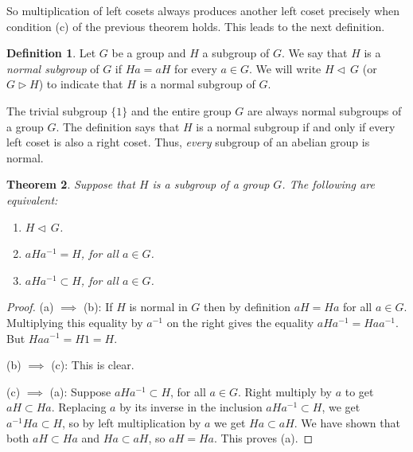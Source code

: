 \documentclass[11pt]{article}
\newtheorem{thm}{Theorem}[section]
\theoremstyle{definition}
\newtheorem{defn}[thm]{Definition}
\newcommand{\normal}{\triangleleft\,}%
\newcommand{\morenormal}{\triangleright}
\begin{document}
So multiplication of left cosets always produces another left coset
precisely when condition (c) of the previous theorem holds. This leads
to the next definition.

\begin{defn}
Let $G$ be a group and $H$ a subgroup of $G$. We say that $H$ is a
{\em normal subgroup} of $G$ if $Ha = aH$ for every $a\in G$. We will
write $H \normal G$ (or $G \morenormal H$) to indicate that $H$ is a
normal subgroup of $G$.
\end{defn}

The trivial subgroup $\{1\}$ and the entire group $G$ are always
normal subgroups of a group $G$.  The definition says that $H$ is a
normal subgroup if and only if every left coset is also a right coset.
Thus, \emph{every} subgroup of an abelian group is normal.


\begin{thm}\label{thm:normality-conds} 
Suppose that $H$ is a subgroup of a group $G$. The following are
equivalent:
\begin{enumerate}
\item $H \normal G$.
\item $aHa^{-1} = H$, for all $a\in G$.
\item $aHa^{-1} \subset H$, for all $a\in G$.
\end{enumerate}
\end{thm}

\begin{proof}
(a) $\implies$ (b): If $H$ is normal in $G$ then by definition $aH=Ha$
for all $a\in G$. Multiplying this equality by $a^{-1}$ on the right 
gives the equality $aHa^{-1} = Haa^{-1}$.  But $Haa^{-1}=H 1 = H$.

(b) $\implies$ (c): This is clear.

(c) $\implies$ (a): Suppose $aHa^{-1} \subset H$, for all $a\in G$.
Right multiply by $a$ to get $aH \subset Ha$. Replacing $a$ by its
inverse in the inclusion $aHa^{-1} \subset H$, we get $a^{-1}Ha
\subset H$, so by left multiplication by $a$ we get $Ha \subset aH$.
We have shown that both $aH \subset Ha$ and $Ha \subset aH$, so $aH =
Ha$. This proves (a). 
\end{proof}
\end{document}
